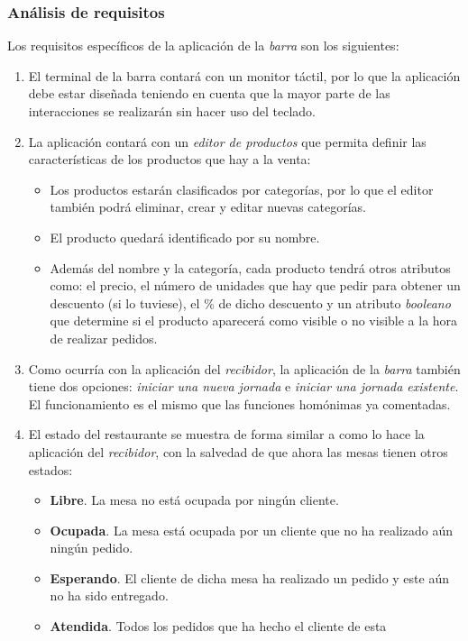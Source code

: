 \subsubsection{Análisis de requisitos}
Los requisitos específicos de la aplicación de la \emph{barra} son los
siguientes:
\begin{enumerate}
\item El terminal de la barra contará con un monitor táctil, por lo que la
aplicación debe estar diseñada teniendo en cuenta que la mayor parte de las
interacciones se realizarán sin hacer uso del teclado.
\item La aplicación contará con un \emph{editor de productos} que permita
definir las características de los productos que hay a la venta:
  \begin{itemize}
  \item Los productos estarán clasificados por categorías, por lo que el
  editor también podrá eliminar, crear y editar nuevas categorías.
  \item El producto quedará identificado por su nombre.
  \item Además del nombre y la categoría, cada producto tendrá otros atributos
  como: el precio, el número de unidades que hay que pedir para obtener un
  descuento (si lo tuviese), el \% de dicho descuento y un atributo
  \emph{booleano} que determine si el producto aparecerá como visible o no
  visible a la hora de realizar pedidos.
  \end{itemize}
\item Como ocurría con la aplicación del \emph{recibidor}, la aplicación de la
\emph{barra} también tiene dos opciones: \emph{iniciar una nueva jornada} e
\emph{iniciar una jornada existente}. El funcionamiento es el mismo que las
funciones homónimas ya comentadas.
\item El estado del restaurante se muestra de forma similar a como lo hace
la aplicación del \emph{recibidor}, con la salvedad de que ahora las mesas
tienen otros estados:
  \begin{itemize}
  \item \textbf{Libre}. La mesa no está ocupada por ningún cliente.
  \item \textbf{Ocupada}. La mesa está ocupada por un cliente que no ha
  realizado aún ningún pedido.
  \item \textbf{Esperando}. El cliente de dicha mesa ha realizado un pedido y
  este aún no ha sido entregado.
  \item \textbf{Atendida}. Todos los pedidos que ha hecho el cliente de esta

\end{itemize}
\end{enumerate}
